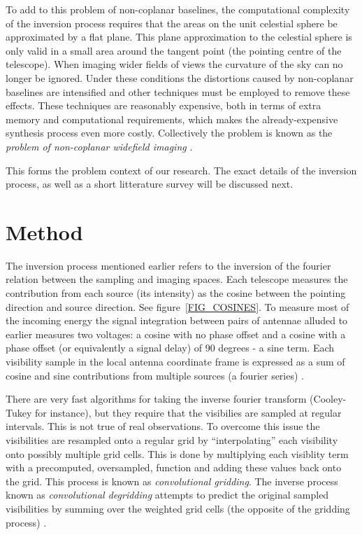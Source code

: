 \documentclass[a4paper, two column]{article}
\begin{document}
To add to this problem of non-coplanar baselines, the computational complexity of the inversion process requires that the areas on the unit celestial sphere be approximated by a flat plane. This 
plane approximation to the celestial sphere is only valid in a small area around the tangent point (the pointing centre of the telescope). When imaging wider fields of views the curvature of the sky
can no longer be ignored. Under these conditions the distortions caused by non-coplanar baselines are intensified and other techniques must be employed to remove these effects. These techniques are
reasonably expensive, both in terms of extra memory and computational requirements, which makes the already-expensive synthesis process even more costly. Collectively the problem is known as the 
\textit{problem of non-coplanar widefield imaging} \cite{taylor1999synthesis}. 

This forms the problem context of our research. The exact details of the inversion process, as well as a short litterature survey will be discussed next.

\section{Method}
The inversion process mentioned earlier refers to the inversion of the fourier relation between the sampling and imaging spaces. Each telescope measures the contribution from each source (its intensity) as the cosine 
between the pointing direction and source direction. See figure~\ref{FIG_COSINES}. To measure most of the incoming energy the signal integration between pairs of antennae alluded to earlier measures two voltages: a cosine 
with no phase offset and a cosine with a phase offset (or equivalently a signal delay) of 90 degrees - a sine term. Each visibility sample in the local antenna coordinate frame is expressed as a sum of cosine and sine 
contributions from multiple sources (a fourier series) \cite{taylor1999synthesis}.

There are very fast algorithms for taking the inverse fourier transform (Cooley-Tukey for instance), but they require that the visibilies are sampled at regular intervals. This is not true of real observations. 
To overcome this issue the visibilities are resampled onto a regular grid by ``interpolating'' each visibility onto possibly multiple grid cells. This is done by multiplying each visiblity term with a precomputed, oversampled, 
function and adding these values back onto the grid. This process is known as \textit{convolutional gridding}. The inverse process known as \textit{convolutional degridding} attempts to predict the original sampled 
visibilities by summing over the weighted grid cells (the opposite of the gridding process) \cite{taylor1999synthesis}.
\end{document}
